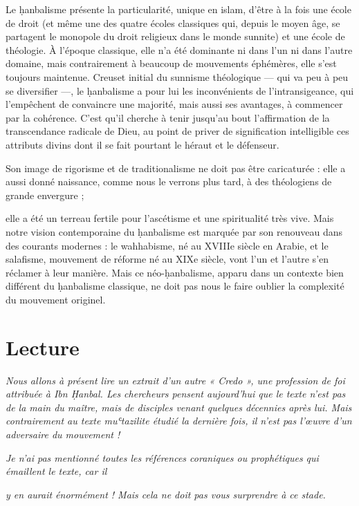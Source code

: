 Le ḥanbalisme présente la particularité, unique en islam, d'être à la
fois une école de droit (et même une des quatre écoles classiques qui,
depuis le moyen âge, se partagent le monopole du droit religieux dans le
monde sunnite) et une école de théologie. À l'époque classique, elle n'a
été dominante ni dans l'un ni dans l'autre domaine, mais contrairement à
beaucoup de mouvements éphémères, elle s'est toujours maintenue. Creuset
initial du sunnisme théologique --- qui va peu à peu se diversifier ---,
le ḥanbalisme a pour lui les inconvénients de l'intransigeance, qui
l'empêchent de convaincre une majorité, mais aussi ses avantages, à
commencer par la cohérence. C'est qu'il cherche à tenir jusqu'au bout
l'affirmation de la transcendance radicale de Dieu, au point de priver
de signification intelligible ces attributs divins dont il se fait
pourtant le héraut et le défenseur.

Son image de rigorisme et de traditionalisme ne doit pas être
caricaturée : elle a aussi donné naissance, comme nous le verrons plus
tard, à des théologiens de grande envergure ;

elle a été un terreau fertile pour l'ascétisme et une spiritualité très
vive. Mais notre vision contemporaine du ḥanbalisme est marquée par son
renouveau dans des courants modernes : le wahhabisme, né au XVIIIe
siècle en Arabie, et le salafisme, mouvement de réforme né au XIXe
siècle, vont l'un et l'autre s'en réclamer à leur manière. Mais ce
néo-ḥanbalisme, apparu dans un contexte bien différent du ḥanbalisme
classique, ne doit pas nous le faire oublier la complexité du mouvement
originel.


\hypertarget{lecture}{%
\section{Lecture}\label{lecture}}


\emph{Nous allons à présent lire un extrait d'un autre « Credo », une
profession de foi attribuée à Ibn Ḥanbal. Les chercheurs pensent
aujourd'hui que le texte n'est pas de la main du maître, mais de
disciples venant quelques décennies après lui. Mais contrairement au
texte muʿtazilite étudié la dernière fois, il n'est pas l'œuvre d'un
adversaire du mouvement !}

\emph{Je n'ai pas mentionné toutes les références coraniques ou
prophétiques qui émaillent le texte, car il}

\emph{y en aurait énormément ! Mais cela ne doit pas vous surprendre à
ce stade.}

